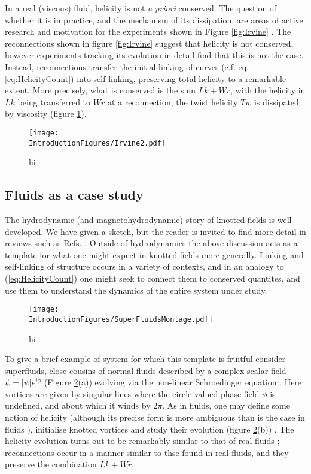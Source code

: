In a real (viscous) fluid, helicity is not \emph{a priori} conserved. The question of whether it is in practice, and the mechanism of its dissipation, are areas of active research and motivation for the experiments shown in Figure \ref{fig:Irvine} \cite{Klecker}. The reconnections shown in figure \ref{fig:Irvine} suggest that helicity is not conserved, however experiments tracking its evolution in detail \cite{Kleckner,Kleckner,Scheeler} find that this is not the case. Instead, reconnections transfer the initial linking of curves (c.f. eq. \ref{eq:HelicityCount}) into self linking, preserving total helicity to a remarkable extent. More precisely, what is conserved is the sum $Lk +Wr$, with the helicity in $Lk$ being transferred to $Wr$ at a reconnection; the twist helicity $Tw$ is dissipated by viscosity (figure \ref{fig:Irvine2}).
\begin{figure}[htbp]
\centering
\texttt{[image: \\IntroductionFigures/Irvine2.pdf]}
\caption{hi }
\label{fig:Irvine2}
\end{figure}

\subsection{Fluids as a case study}
The hydrodynamic (and magnetohydrodynamic) story of knotted fields is well developed. We have given a sketch, but the reader is invited to find more detail in reviews such as Refs. \cite{Moffat, Irvine}. Outside of hydrodynamics the above discussion acts as a template for what one might expect in knotted fields more generally. Linking and self-linking of structure occurs in a variety of contexts, and in an analogy to (\ref{eq:HelicityCount}) one might seek to connect them to conserved quantites, and use them to understand the dynamics of the entire system under study.
\begin{figure}[htbp]
\centering
\texttt{[image: \\IntroductionFigures/SuperFluidsMontage.pdf]}
\caption{hi }
\label{fig:SuperFluidMontage}
\end{figure}

To give a brief example of system for which this template is fruitful consider superfluids, close cousins of normal fluids described by a complex scalar field $\psi = |\psi| e^{i \phi}$ (Figure \ref{fig:SuperFluidMontage}(a)) evolving via the non-linear Schroedinger equation \cite{scheeler}. Here vortices are given by singular lines where the circle-valued phase field $\phi$ is undefined, and about which it winds by $2\pi$. As in fluids, one may define some notion of helicity (although its precise form is more ambiguous than is the case in fluids \cite{Salman}), initialise knotted vortices and study their evolution (figure \ref{fig:SuperFluidMontage}(b)) \cite{Scheeler}. The helicity evolution turns out to be remarkably similar to that of real fluids \cite{Scheeler}; reconnections occur in a manner similar to thse found in real fluids, and they preserve the combination $Lk+Wr$.  
